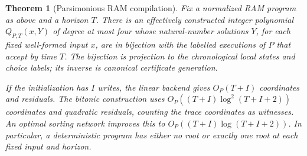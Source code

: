 \documentclass[11pt,a4paper]{article}
\newtheorem{theorem}{Theorem}[section]
\theoremstyle{definition}
\theoremstyle{remark}
\begin{document}
\begin{theorem}[Parsimonious RAM compilation]\label{cdc:mem:thm:ram}
Fix a normalized RAM program as above and a horizon $T$. There is an effectively
constructed integer polynomial $Q_{P,T}(x,Y)$ of degree at most four whose
natural-number solutions $Y$, for each fixed well-formed input $x$, are in
bijection with the labelled executions of $P$ that accept by time $T$.
The bijection is projection to the chronological local states and choice
labels; its inverse is canonical certificate generation.

If the initialization has $I$ writes, the linear backend gives
$O_P(T+I)$ coordinates and residuals. The bitonic construction uses
$O_P((T+I)\log^2(T+I+2))$ coordinates and quadratic residuals, counting the
trace coordinates as witnesses. An optimal sorting network improves this to
$O_P((T+I)\log(T+I+2))$. In particular, a deterministic program has either no
root or exactly one root at each fixed input and horizon.
\end{theorem}
\end{document}
